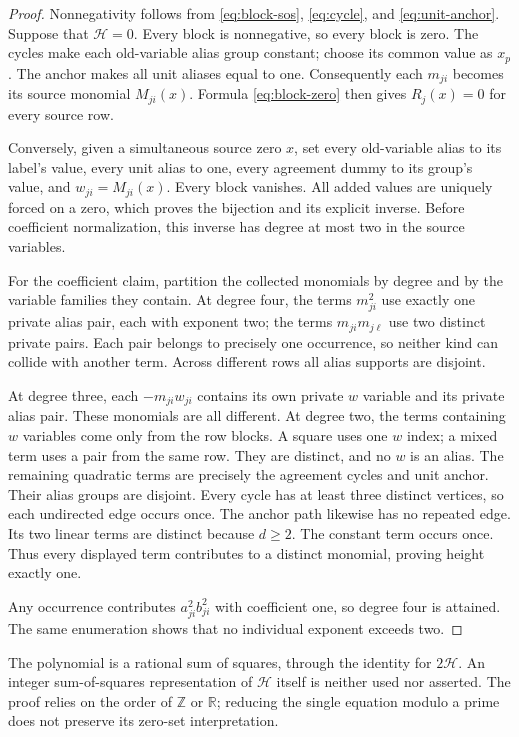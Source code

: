 \begin{proof}
Nonnegativity follows from \eqref{eq:block-sos}, \eqref{eq:cycle}, and
\eqref{eq:unit-anchor}. Suppose that $\mathcal H=0$. Every block is
nonnegative, so every block is zero. The cycles make each old-variable
alias group constant; choose its common value as $x_p$. The anchor makes
all unit aliases equal to one. Consequently each $m_{ji}$ becomes its
source monomial $M_{ji}(x)$. Formula \eqref{eq:block-zero} then gives
$R_j(x)=0$ for every source row.

Conversely, given a simultaneous source zero $x$, set every old-variable
alias to its label's value, every unit alias to one, every agreement
dummy to its group's value, and $w_{ji}=M_{ji}(x)$. Every block vanishes.
All added values are uniquely forced on a zero, which proves the
bijection and its explicit inverse. Before coefficient normalization,
this inverse has degree at most two in the source variables.

For the coefficient claim, partition the collected monomials by degree
and by the variable families they contain. At degree four, the terms
$m_{ji}^2$ use exactly one private alias pair, each with exponent two;
the terms $m_{ji}m_{j\ell}$ use two distinct private pairs. Each pair
belongs to precisely one occurrence, so neither kind can collide with
another term. Across different rows all alias supports are disjoint.

At degree three, each $-m_{ji}w_{ji}$ contains its own private $w$ variable
and its private alias pair. These monomials are all different.
At degree two, the terms containing $w$ variables come only from the row
blocks. A square uses one $w$ index; a mixed term uses a pair from the
same row. They are distinct, and no $w$ is an alias. The remaining
quadratic terms are precisely the agreement cycles and unit anchor.
Their alias groups are disjoint. Every cycle has at least three distinct
vertices, so each undirected edge occurs once. The anchor path likewise
has no repeated edge. Its two linear terms are distinct because $d\ge2$.
The constant term occurs once. Thus every displayed term contributes to
a distinct monomial, proving height exactly one.

Any occurrence contributes $a_{ji}^2b_{ji}^2$ with coefficient one, so
degree four is attained. The same enumeration shows that no individual
exponent exceeds two.
\end{proof}

The polynomial is a rational sum of squares, through the identity for
$2\mathcal H$. An integer sum-of-squares representation of $\mathcal H$
itself is neither used nor asserted. The proof relies on the order of
$\mathbb Z$ or $\mathbb R$; reducing the single equation modulo a prime
does not preserve its zero-set interpretation.

